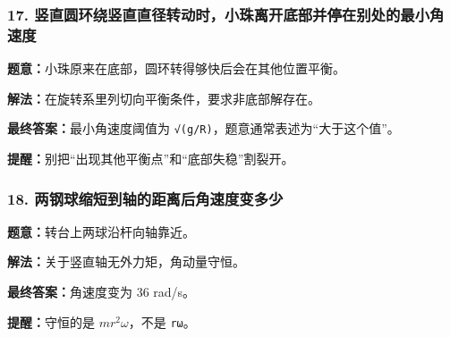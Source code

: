 \documentclass[12pt,a4paper]{ctexart}
\begin{document}
\subsubsection*{17. 竖直圆环绕竖直直径转动时，小珠离开底部并停在别处的最小角速度}
\begin{tcolorbox}[colback=gray!2!white,colframe=black!60,title={题目}]
\textbf{题意：}小珠原来在底部，圆环转得够快后会在其他位置平衡。\par
\end{tcolorbox}
\begin{tcolorbox}[colback=blue!2!white,colframe=blue!55!black,title={完整答案}]
\textbf{解法：}在旋转系里列切向平衡条件，要求非底部解存在。\par
\textbf{最终答案：}最小角速度阈值为 \texttt{√(g/R)}，题意通常表述为“大于这个值”。\par

\end{tcolorbox}
\begin{tcolorbox}[colback=red!2!white,colframe=red!55!black,title={易错点}]
\textbf{提醒：}别把“出现其他平衡点”和“底部失稳”割裂开。\par
\end{tcolorbox}

\subsubsection*{18. 两钢球缩短到轴的距离后角速度变多少}
\begin{tcolorbox}[colback=gray!2!white,colframe=black!60,title={题目}]
\textbf{题意：}转台上两球沿杆向轴靠近。\par
\end{tcolorbox}
\begin{tcolorbox}[colback=blue!2!white,colframe=blue!55!black,title={完整答案}]
\textbf{解法：}关于竖直轴无外力矩，角动量守恒。\par
\textbf{最终答案：}角速度变为 36 rad/s。\par

\end{tcolorbox}
\begin{tcolorbox}[colback=red!2!white,colframe=red!55!black,title={易错点}]
\textbf{提醒：}守恒的是 \(mr^2ω\)，不是 \texttt{rω}。\par
\end{tcolorbox}
\end{document}
